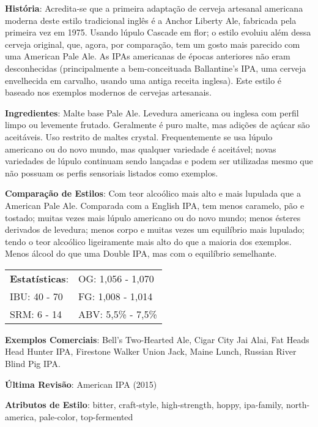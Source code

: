 \textbf{História}: Acredita-se que a primeira adaptação de cerveja artesanal americana moderna deste estilo tradicional inglês é a Anchor Liberty Ale, fabricada pela primeira vez em 1975. Usando lúpulo Cascade em flor; o estilo evoluiu além dessa cerveja original, que, agora, por comparação, tem um gosto mais parecido com uma American Pale Ale. As IPAs americanas de épocas anteriores não eram desconhecidas (principalmente a bem-conceituada Ballantine's IPA, uma cerveja envelhecida em carvalho, usando uma antiga receita inglesa). Este estilo é baseado nos exemplos modernos de cervejas artesanais.

\textbf{Ingredientes}: Malte base Pale Ale. Levedura americana ou inglesa com perfil limpo ou levemente frutado. Geralmente é puro malte, mas adições de açúcar são aceitáveis. Uso restrito de maltes crystal. Frequentemente se usa lúpulo americano ou do novo mundo, mas qualquer variedade é aceitável; novas variedades de lúpulo continuam sendo lançadas e podem ser utilizadas mesmo que não possuam os perfis sensoriais listados como exemplos.

\textbf{Comparação de Estilos}: Com teor alcoólico mais alto e mais lupulada que a American Pale Ale. Comparada com a English IPA, tem menos caramelo, pão e tostado; muitas vezes mais lúpulo americano ou do novo mundo; menos ésteres derivados de levedura; menos corpo e muitas vezes um equilíbrio mais lupulado; tendo o teor alcoólico ligeiramente mais alto do que a maioria dos exemplos. Menos álcool do que uma Double IPA, mas com o equilíbrio semelhante.

\begin{tabular}{@{}p{35mm}p{35mm}@{}}
  \textbf{Estatísticas}: & OG: 1,056 - 1,070 \\
  IBU: 40 - 70  & FG: 1,008 - 1,014 \\
  SRM: 6 - 14  & ABV: 5,5\% - 7,5\%
\end{tabular}

\textbf{Exemplos Comerciais}: Bell's Two-Hearted Ale, Cigar City Jai Alai, Fat Heads Head Hunter IPA, Firestone Walker Union Jack, Maine Lunch, Russian River Blind Pig IPA.

\textbf{Última Revisão}: American IPA (2015)

\textbf{Atributos de Estilo}: bitter, craft-style, high-strength, hoppy, ipa-family, north-america, pale-color, top-fermented